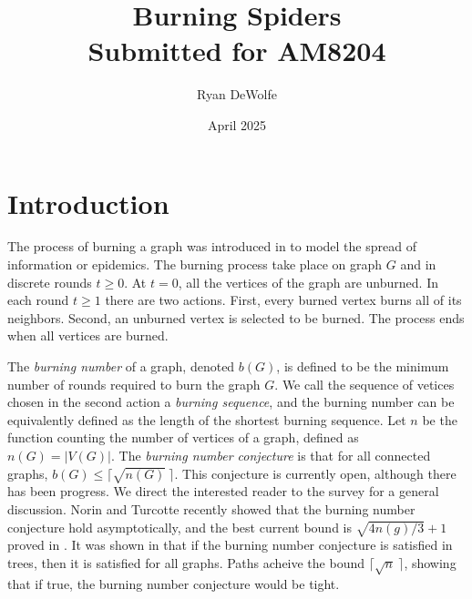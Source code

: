 \documentclass[12pt]{article}
\begin{document}
\title{
    Burning Spiders\\
    \large{Submitted for AM8204}
}
\author{Ryan DeWolfe}
\date{April 2025}
\maketitle


\section{Introduction}
The process of burning a graph was introduced in \cite{burning_intro} to model the spread of information or epidemics.
The burning process take place on graph $G$ and in discrete rounds $t \geq 0$. 
At $t=0$, all the vertices of the graph are unburned.
In each round $t \geq 1$ there are two actions.
First, every burned vertex burns all of its neighbors.
Second, an unburned vertex is selected to be burned.
The process ends when all vertices are burned.

The \textit{burning number} of a graph, denoted $b(G)$, is defined to be the minimum number of rounds required to burn the graph $G$.
We call the sequence of vetices chosen in the second action a \textit{burning sequence}, and the burning number can be equivalently defined as the length of the shortest burning sequence.
Let $n$ be the function counting the number of vertices of a graph, defined as $n(G) = |V(G)|$.
The \textit{burning number conjecture} \cite{burning_intro} is that for all connected graphs, $b(G) \leq \lceil \sqrt{n(G)}\ \rceil$.
This conjecture is currently open, although there has been progress.
We direct the interested reader to the survey \cite{burning_survey} for a general discussion.
Norin and Turcotte \cite{asymptotic_bnc} recently showed that the burning number conjecture hold asymptotically, and the best current bound is $\sqrt{4n(g) \slash 3} + 1$ proved in \cite{best_bnc}. 
It was shown in \cite{burning_intro} that if the burning number conjecture is satisfied in trees, then it is satisfied for all graphs.
Paths acheive the bound $\lceil \sqrt{n}\ \rceil$, showing that if true, the burning number conjecture would be tight.
\end{document}
